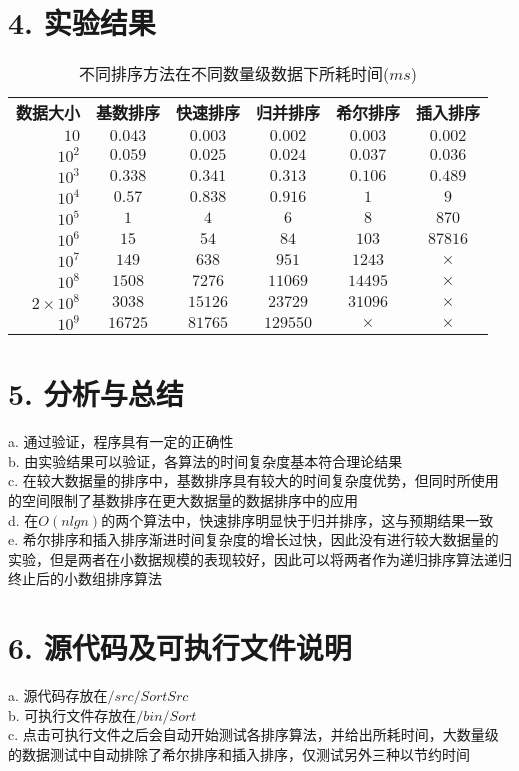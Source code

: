 \documentclass[12pt]{article}
\begin{document}
  \section*{4. 实验结果}
    \begin{table}[h!]
      \begin{center}
        \caption{不同排序方法在不同数量级数据下所耗时间($ms$)}
        \begin{tabular}{r|c|c|c|c|c}
          \toprule
          \textbf{数据大小} & \textbf{基数排序} & \textbf{快速排序} & \textbf{归并排序} & \textbf{希尔排序} & \textbf{插入排序}\\
          $10$ & $0.043$ & $0.003$ & $0.002$ & $0.003$ & $0.002$\\
          $10^2$ & $0.059$ & $0.025$ & $0.024$ & $0.037$ & $0.036$\\
          $10^3$ & $0.338$ & $0.341$ & $0.313$ & $0.106$ & $0.489$\\
          $10^4$ & $0.57$ & $0.838$ & $0.916$ & $1$ & $9$\\
          $10^5$ & $1$ & $4$ & $6$ & $8$ & $870$\\
          $10^6$ & $15$ & $54$ & $84$ & $103$ & $87816$\\
          $10^7$ & $149$ & $638$ & $951$ & $1243$ & $\times$\\
          $10^8$ & $1508$ & $7276$ & $11069$ & $14495$ & $\times$\\
          $2\times10^8$ & $3038$ & $15126$ & $23729$ & $31096$ & $\times$\\
          $10^9$ & $16725$ & $81765$ & $129550$ & $\times$ & $\times$\\
          \midrule
          \bottomrule
        \end{tabular}
      \end{center}
    \end{table}
  \section*{5. 分析与总结}
  a. 通过验证，程序具有一定的正确性\\
  b. 由实验结果可以验证，各算法的时间复杂度基本符合理论结果\\
  c. 在较大数据量的排序中，基数排序具有较大的时间复杂度优势，但同时所使用的空间限制了基数排序在更大数据量的数据排序中的应用\\
  d. 在$O(nlgn)$的两个算法中，快速排序明显快于归并排序，这与预期结果一致\\
  e. 希尔排序和插入排序渐进时间复杂度的增长过快，因此没有进行较大数据量的实验，但是两者在小数据规模的表现较好，因此可以将两者作为递归排序算法递归终止后的小数组排序算法
  \section*{6. 源代码及可执行文件说明}
  a. 源代码存放在$/src/SortSrc$\\
  b. 可执行文件存放在$/bin/Sort$\\
  c. 点击可执行文件之后会自动开始测试各排序算法，并给出所耗时间，大数量级的数据测试中自动排除了希尔排序和插入排序，仅测试另外三种以节约时间\\
\end{document}
